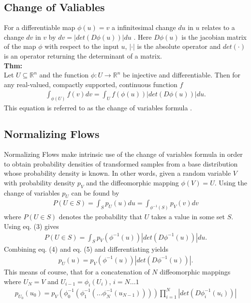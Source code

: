 \documentclass{article}
\begin{document}
\subsection{Change of Valiables}
For a differentiable map $\phi(u)=v$ a infinitesimal change $du$ in $u$ relates to a change $dv$ in $v$ by $d v = |det(D\phi(u))| d u$ . Here $D\phi(u)$ is the jacobian matrix of the map $\phi$ with respect to the input $u$, $|\cdot|$ is the absolute operator and $det(\cdot)$ is an operator returning the determinant of a matrix.\\
\textbf{Thm:}\\
Let $U\subseteq \mathbb{R}^n$ and the function $\phi : U \rightarrow \mathbb{R}^n$ be injective and differentiable. Then for any real-valued, compactly supported, continuous function $f$
\begin{align}
	\int_{\phi(U)} f(v)dv = \int_U f(\phi(u)) |det(D\phi(u))| du .
\end{align}
This equation is referred to as the change of variables formula \cite{wiki:vc}.

\subsection{Normalizing Flows}
Normalizing Flows make intrinsic use of the change of variables formula in order to obtain probability densities of transformed samples from a base distribution whose probability density is known. In other words, given a random variable $V$ with probability density $p_V$ and the diffeomorphic mapping $\phi(V)=U$. Using the change of variables $p_U$ can be found by
\begin{align}
	P(U\in S) = \int_S p_U(u)du = \int_{\phi^{-1}(S)} p_V(v)dv 
\end{align}
where $P(U\in S)$ denotes the probability that $U$ takes a value in some set $S$.
Using eq. (3) gives
\begin{align}
	P(U\in S) = \int_S p_V(\phi^{-1}(u))|det(D\phi^{-1}(u))|du .
\end{align}
Combining eq. (4) and eq. (5) and differentiating yields
\begin{align}
p_U(u) = p_V(\phi^{-1}(u))|det(D\phi^{-1}(u))| .
\end{align}
This means of course, that for a concatenation of $N$ diffeomorphic mappings where $U_N=V$ and $U_{i-1} = \phi_i(U_i)$, $i = N...1$
\begin{align}
p_{U_0}(u_0) = p_V(\phi_0^{-1}(\phi_1^{-1}(...\phi_N^{-1}(u_{N-1}))))\prod_{i=1}^{N}|det(D\phi_i^{-1}(u_i))|
\end{align}
\end{document}
